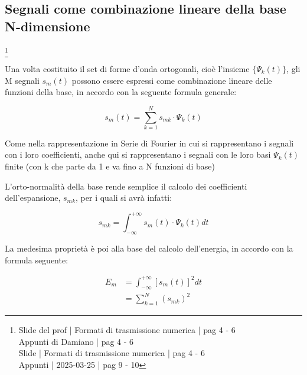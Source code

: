\newpage 

\subsection{Segnali come combinazione lineare della base N-dimensione}
\footnote{Slide del prof | Formati di trasmissione numerica | pag 4 - 6\\  
Appunti di Damiano | pag 4 - 6\\
Slide | Formati di trasmissione numerica | pag  4 - 6\\
Appunti | 2025-03-25 | pag 9 - 10
}

Una volta costituito il set di forme d'onda ortogonali, 
cioè l'insieme $\{ \Psi_k (t) \} $, 
gli M segnali $s_m (t)$ possono essere espressi come combinazione lineare delle funzioni della base, 
in accordo con la seguente formula generale: 

{
    \Large 
    \begin{equation}
        s_m (t) 
        = 
        \sum_{k = 1}^{N}
        s_{mk} \cdot \Psi_{k} (t)
    \end{equation}
}

\begin{tcolorbox}
    Come nella rappresentazione in Serie di Fourier in cui si rappresentano i segnali con i loro coefficienti, 
    anche qui si rappresentano i segnali con le loro basi $\Psi_k (t)$ finite (con k che parte da 1 e va fino a N funzioni di base)
\end{tcolorbox}

L'orto-normalità della base rende semplice il calcolo dei coefficienti dell'espansione, $s_{mk}$, 
per i quali si avrà infatti: 

{
    \Large
    \begin{equation}
        s_{mk}
        = 
        \int_{-\infty}^{+ \infty}
        s_{m} (t) \cdot \Psi_{k} (t) dt
    \end{equation}
}

La medesima proprietà è poi alla base del calcolo dell'energia, 
in accordo con la formula seguente: 

{
    \Large 
    \begin{equation}
        \begin{split}
            E_{m}
            &= 
            \int_{- \infty}^{+ \infty}
            \left[ s_{m} (t) \right]^{2} dt 
            \\
            &= 
            \sum_{k = 1}^{N} (s_{mk})^{2}
        \end{split}
    \end{equation}
}

